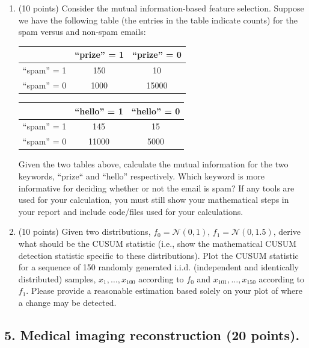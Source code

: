 \documentclass[twoside,10pt]{article}
\begin{document}
\begin{enumerate}

\item (10 points) Consider the mutual information-based feature selection. Suppose we have the following table (the entries in the table indicate counts) for the spam versus and non-spam emails:
%
\begin{center}
\begin{tabular}{c|c|c}
\hline
& ``prize'' = 1 & ``prize'' = 0 \\\hline
``spam'' = 1 & 150& 10 \\ \hline 
 ``spam'' = 0 & 1000 & 15000  \\\hline
\end{tabular}
\end{center}

\begin{center}
\begin{tabular}{c|c|c}
\hline
& ``hello'' = 1 & ``hello'' = 0 \\\hline
``spam'' = 1 & 145 & 15 \\ \hline 
 ``spam'' = 0 & 11000 & 5000  \\\hline
\end{tabular}
\end{center}

Given the two tables above, calculate the mutual information for the two keywords, ``prize`` and ``hello'' respectively. Which keyword is more informative for deciding whether or not the email is spam? If any tools are used for your calculation, you must still show your mathematical steps in your report and include code/files used for your calculations.

\item  (10 points)  Given two distributions, $f_0 = \mathcal{N}(0, 1)$, $f_1 = \mathcal{N}(0, 1.5)$, derive what should be the CUSUM statistic (i.e., show the mathematical CUSUM detection statistic specific to these distributions). Plot the CUSUM statistic for a sequence of 150 randomly generated i.i.d. (independent and identically distributed) samples, $x_1, \ldots, x_{100}$ according to $f_0$ and $x_{101}, \ldots, x_{150}$ according to $f_1$. Please provide a reasonable estimation based solely on your plot of where a change may be detected.


\end{enumerate}


\subsection*{5. Medical imaging reconstruction (20 points).} 
\end{document}
